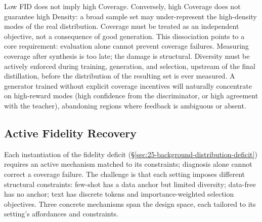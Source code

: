 \begin{foldable}
  Low \ac{FID} does not imply high Coverage.
  Conversely, high Coverage does not guarantee high Density: a broad sample set may under-represent the high-density modes of the real distribution.
  Coverage must be treated as an independent objective, not a consequence of good generation.
  This dissociation points to a core requirement: evaluation alone cannot prevent coverage failures.
  Measuring coverage after synthesis is too late; the damage is structural.
  Diversity must be actively enforced during training, generation, and selection, upstream of the final distillation, before the distribution of the resulting set is ever measured.
  A generator trained without explicit coverage incentives will naturally concentrate on high-reward modes (high confidence from the discriminator, or high agreement with the teacher), abandoning regions where feedback is ambiguous or absent.
\end{foldable}

\subsection{Active Fidelity Recovery} \label{sec:25-background-distribution-remedy}
\begin{foldable}
  Each instantiation of the fidelity deficit (\S\ref{sec:25-background-distribution-deficit}) requires an active mechanism matched to its constraints; diagnosis alone cannot correct a coverage failure.
  The challenge is that each setting imposes different structural constraints: few-shot has a data anchor but limited diversity; data-free has no anchor; text has discrete tokens and importance-weighted selection objectives.
  Three concrete mechanisms span the design space, each tailored to its setting's affordances and constraints.
\end{foldable}

